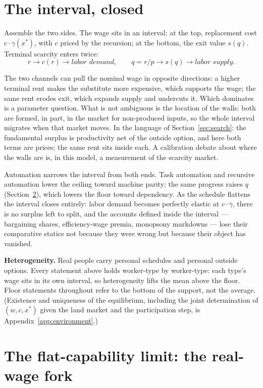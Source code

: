 \documentclass[12pt]{article}
\theoremstyle{plain}
\begin{document}
\section{The interval, closed}\label{sec:interval}

Assemble the two sides. The wage sits in an interval: at the top, replacement cost $c\cdot \gamma (x^*)$, with $c$ priced by the recursion; at the bottom, the exit value $s(q)$. Terminal scarcity enters twice:
\[
r \to c(r) \to \textit{labor demand},\qquad q = r/p \to s(q) \to \textit{labor supply}.
\]

The two channels can pull the nominal wage in opposite directions: a higher terminal rent makes the substitute more expensive, which supports the wage; the same rent erodes exit, which expands supply and undercuts it. Which dominates is a parameter question. What is not ambiguous is the location of the walls: both are formed, in part, in the market for non-produced inputs, so the whole interval migrates when that market moves. In the language of Section~\ref{sec:search}: the fundamental surplus is productivity net of the outside option, and here both terms are prices; the same rent sits inside each. A calibration debate about where the walls are is, in this model, a measurement of the scarcity market.

Automation narrows the interval from both ends. Task automation and recursive automation lower the ceiling toward machine parity; the same progress raises $q$ (Section~\ref{sec:limit}), which lowers the floor toward dependency. As the schedule flattens the interval closes entirely: labor demand becomes perfectly elastic at $c\cdot \bar{\gamma}$, there is no surplus left to split, and the accounts defined inside the interval --- bargaining shares, efficiency-wage premia, monopsony markdowns --- lose their comparative statics not because they were wrong but because their object has vanished.

\textbf{Heterogeneity.} Real people carry personal schedules and personal outside options. Every statement above holds worker-type by worker-type: each type's wage sits in its own interval, so heterogeneity lifts the mean above the floor. Floor statements throughout refer to the bottom of the support, not the average. (Existence and uniqueness of the equilibrium, including the joint determination of $(w, c, x^*)$ given the land market and the participation step, is Appendix~\ref{app:environment}.)

\section{The flat-capability limit: the real-wage fork}\label{sec:limit}
\end{document}
